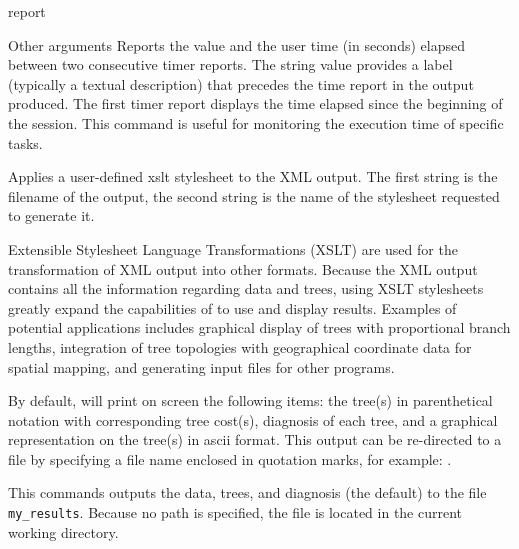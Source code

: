 \begin{command}{report}{}
\begin{arguments}
\begin{argumentgroup}{Other arguments}
                {Reports the value and the user time (in seconds) elapsed between
                two consecutive timer reports. The string value provides a label
                (typically a textual description) that precedes the time report
                in the output produced.
                The first timer report displays the time elapsed since the beginning of the
                \poy session. This command is useful for monitoring the execution time
                of specific tasks.}
                {}
                
	     {Applies a user-defined xslt stylesheet to the XML output. The first string is
	     the filename of the output, the second string is the name of the stylesheet
	     requested to generate it.}
	     {}
	     
	     \begin{statement}
	     Extensible Stylesheet Language Transformations (XSLT) are used
	     for the transformation of XML output into other formats. Because the XML 
	     output contains all the information regarding data and trees, using XSLT 
	     stylesheets greatly expand the capabilities of \poy to use and display results.
	     Examples of potential applications includes graphical display of trees with proportional branch lengths,
	     integration of tree topologies with geographical coordinate data for spatial mapping, and
	     generating input files for other programs.
	     \end{statement}
	     
	     \end{argumentgroup}
	\end{arguments}

        {By default, \poy will print on screen the following items: the tree(s)
        in parenthetical notation with corresponding tree cost(s), diagnosis of
        each tree, and a graphical representation on the tree(s) in ascii
        format. This output can be re-directed to a file by specifying a file
        name enclosed in quotation marks, for example:
        .}

	\begin{poyexamples} 

		{This commands outputs the data, trees, and diagnosis (the default) to the
		file \texttt{my\_results}. Because no path is specified, the
		file is located in the current working directory.}
		

\end{poyexamples}
\end{command}
